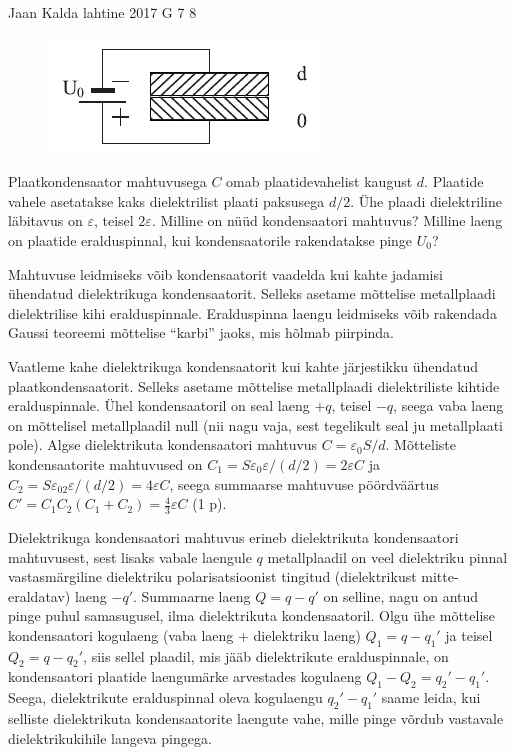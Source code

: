 {Jaan Kalda} %
{lahtine} %
{2017} %
{G 7} %
{8} %
{
\ifStatement
\begin{figure}
	\vspace{-13pt}
	\includegraphics[width=\linewidth]{2017-lahg-07-res-cap2.pdf}
\end{figure}

Plaatkondensaator mahtuvusega $C$ omab plaatidevahelist kaugust $d$. Plaatide vahele asetatakse kaks dielektrilist plaati paksusega $d/2$. Ühe plaadi dielektriline läbitavus on $\varepsilon$, teisel $2\varepsilon$. Milline on nüüd kondensaatori mahtuvus? Milline laeng on plaatide eralduspinnal, kui kondensaatorile rakendatakse pinge $U_0$?
\fi


\ifHint
Mahtuvuse leidmiseks võib kondensaatorit vaadelda kui kahte jadamisi ühendatud dielektrikuga kondensaatorit. Selleks asetame mõttelise metallplaadi dielektrilise kihi eralduspinnale. Eralduspinna laengu leidmiseks võib rakendada Gaussi teoreemi mõttelise \enquote{karbi} jaoks, mis hõlmab piirpinda.
\fi


\ifSolution
Vaatleme kahe dielektrikuga kondensaatorit kui kahte järjestikku ühendatud plaatkondensaatorit. Selleks asetame mõttelise metallplaadi dielektriliste kihtide eralduspinnale. Ühel kondensaatoril on seal laeng $+q$, teisel $-q$, seega vaba laeng on mõttelisel metallplaadil null (nii nagu vaja, sest tegelikult seal ju metallplaati pole). Algse dielektrikuta kondensaatori mahtuvus $C=\varepsilon_0S/d$. Mõtteliste kondensaatorite mahtuvused on $C_1=S\varepsilon_0\varepsilon/(d/2)=2\varepsilon C$ ja $C_2=S\varepsilon_02\varepsilon/(d/2)=4\varepsilon C$, seega summaarse mahtuvuse pöördväärtus $C'=C_1C_2(C_1+C_2)=\frac 43\varepsilon C$ (1 p).

Dielektrikuga kondensaatori mahtuvus erineb dielektrikuta kondensaatori mahtuvusest, sest lisaks vabale laengule $q$ metallplaadil on veel dielektriku pinnal vastasmärgiline dielektriku polarisatsioonist tingitud (dielektrikust mitte-eraldatav) laeng $-q'$. Summaarne laeng $Q=q-q'$ on selline, nagu on antud pinge puhul samasugusel, ilma dielektrikuta kondensaatoril. Olgu ühe mõttelise kondensaatori kogulaeng (vaba laeng + dielektriku laeng) $Q_1=q-q_1'$ ja teisel $Q_2=q-q_2'$, siis sellel plaadil, mis jääb dielektrikute eralduspinnale, on kondensaatori plaatide laengumärke arvestades kogulaeng $Q_1-Q_2=q_2'-q_1'$. Seega, dielektrikute eralduspinnal oleva kogulaengu $q_2'-q_1'$ saame leida, kui selliste dielektrikuta kondensaatorite laengute vahe, mille pinge võrdub vastavale dielektrikukihile langeva pingega. 

}
